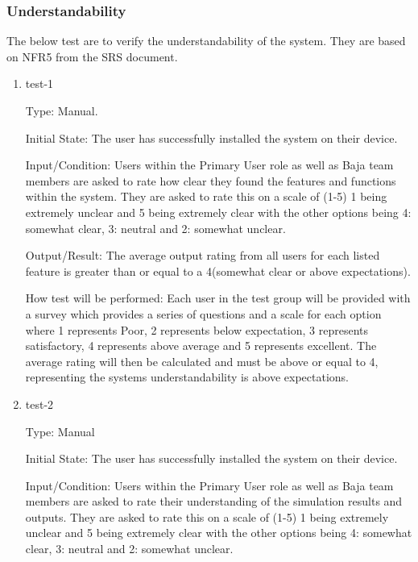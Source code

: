 \documentclass[12pt, titlepage]{article}
\begin{document}
\subsubsection{Understandability}

The below test are to verify the understandability of the system.
They are based on NFR5 from the SRS document.
\begin{enumerate}

  \item{test-1\\}
  
  Type: Manual.
            
  Initial State: The user has successfully installed the system on their device.
            
  Input/Condition: Users within the Primary User role as well as Baja team members are asked to rate how clear they found the features and functions within the system. 
  They are asked to rate this on a scale of (1-5) 1 being extremely unclear and 5 being extremely clear with the other options being 4: somewhat clear, 3: neutral and 2: somewhat unclear. 
            
  Output/Result: The average output rating from all users for each listed feature is greater than or equal to a 4(somewhat clear or above expectations).
            
  How test will be performed: Each user in the test group will be provided with a survey which provides a series of questions and a scale for each option where 1 represents Poor, 2 represents below expectation, 3 represents satisfactory, 4 represents above average and 5 represents excellent.
  The average rating will then be calculated and must be above or equal to 4, representing the systems understandability is above expectations.  
  
  \item{test-2\\}
  
  Type: Manual
            
  Initial State: The user has successfully installed the system on their device.
            
  Input/Condition: Users within the Primary User role as well as Baja team members are asked to rate their understanding of the simulation results and outputs. 
  They are asked to rate this on a scale of (1-5) 1 being extremely unclear and 5 being extremely clear with the other options being 4: somewhat clear, 3: neutral and 2: somewhat unclear. 
            

\end{enumerate}
\end{document}
